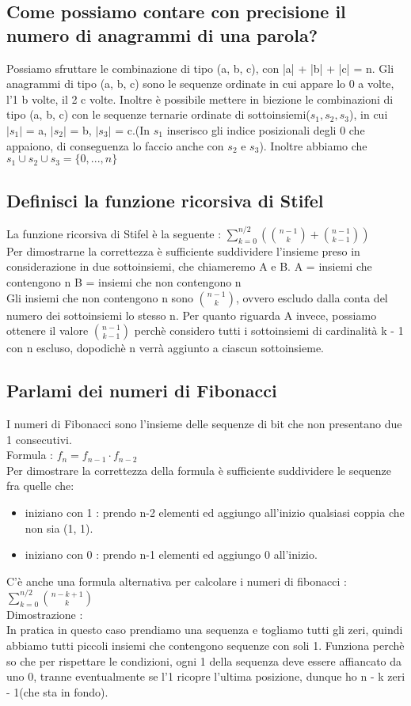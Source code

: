 \documentclass[a4paper,12pt]{report}
\begin{document}
	\subsection{Come possiamo contare con precisione il numero di anagrammi di una parola?}
	Possiamo sfruttare le combinazione di tipo (a, b, c), con |a| + |b| + |c| = n.
	Gli anagrammi di tipo (a, b, c)  sono le sequenze ordinate in cui appare lo 0 a volte, l'1 b volte, il 2 c volte.
	Inoltre è possibile mettere in biezione le combinazioni di tipo (a, b, c) con le sequenze ternarie ordinate di sottoinsiemi($s_1, s_2, s_3$), in cui $|s_1|$ = a, $|s_2|$ = b, $|s_3|$ = c.(In $s_1$ inserisco gli indice posizionali degli 0 che appaiono, di conseguenza lo faccio anche con $s_2$ e $s_3$).
	Inoltre abbiamo che $s_1 \cup s_2 \cup s_3 = \{0, ..., n\}$
	\subsection{Definisci la funzione ricorsiva di Stifel}
	La funzione ricorsiva di Stifel è la seguente : $\sum_{k = 0}^{n/2}(\binom{n - 1}{k} + \binom{n - 1}{k - 1})$ \\
	Per dimostrarne la correttezza è sufficiente suddividere l'insieme preso in considerazione in due sottoinsiemi, che chiameremo A e B.
	A = { insiemi che contengono n }
	B = { insiemi che non contengono n} \\
	Gli insiemi che non contengono n sono $\binom{n - 1}{k}$, ovvero escludo dalla conta del numero dei sottoinsiemi lo stesso n. Per quanto riguarda A invece, possiamo ottenere il valore $\binom{n - 1}{k - 1}$ perchè considero tutti i sottoinsiemi di cardinalità k - 1 con n escluso, dopodichè n verrà aggiunto a ciascun sottoinsieme.
	\subsection{Parlami dei numeri di Fibonacci}
	I numeri di Fibonacci sono l'insieme delle sequenze di bit che non presentano due 1 consecutivi. \\
	Formula : $f_n = f_{n - 1} \cdot f_{n - 2}$ \\
	Per dimostrare la correttezza della formula è sufficiente suddividere le sequenze fra quelle che: 
	\begin{itemize}
		\item iniziano con 1 : prendo n-2 elementi ed aggiungo all'inizio qualsiasi coppia che non sia (1, 1).  
		\item iniziano con 0 : prendo n-1 elementi ed aggiungo 0 all'inizio.
	\end{itemize}
	C'è anche una formula alternativa per calcolare i numeri di fibonacci : $\sum_{k = 0}^{n/2}\binom{n - k + 1}{k}$ \\
	Dimostrazione : \\
	In pratica in questo caso prendiamo una sequenza e togliamo tutti gli zeri, quindi abbiamo tutti piccoli insiemi che contengono sequenze con soli 1. Funziona perchè so che per rispettare le condizioni, ogni 1 della sequenza deve essere affiancato da uno 0, tranne eventualmente se l'1 ricopre l'ultima posizione, dunque ho n - k zeri - 1(che sta in fondo).
	
	
	
	
\end{document}
